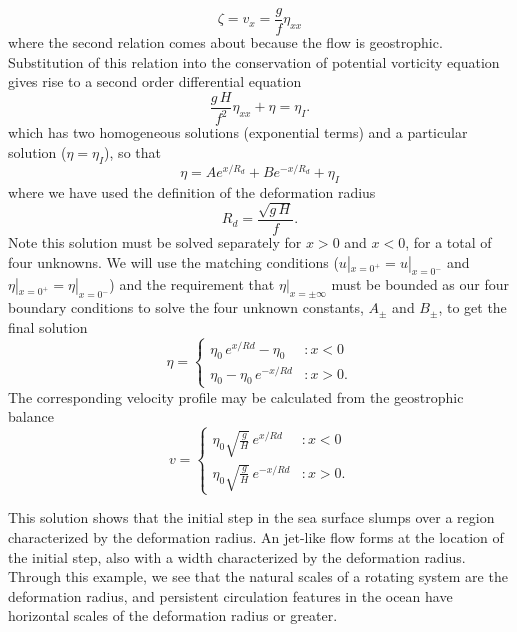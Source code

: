 \documentclass[11pt]{report}
\numberwithin{equation}{section}
\begin{document}
\begin{equation}
    \zeta = v_x = \frac{g}{f} \eta_{xx}
\end{equation}
where the second relation comes about because the flow is geostrophic.  Substitution of this relation into the conservation of potential vorticity equation gives rise to a second order differential equation
\begin{equation}
    \label{eq:step_adjustment_field}
    \frac{g\,H}{f^2} \eta_{xx} + \eta = \eta_I.
\end{equation}
which has two homogeneous solutions (exponential terms) and a particular solution ($\eta=\eta_I$), so that
\begin{equation}
    \eta = A e^{x/R_d} + B e^{-x/R_d} + \eta_I
\end{equation}
where we have used the definition of the deformation radius
\begin{equation}
    R_d = \frac{\sqrt{g\,H}}{f}.
\end{equation}
Note this solution must be solved separately for $x>0$ and $x<0$, for a total of four unknowns.  We will use the matching conditions ($u|_{x=0^+} = u|_{x=0^-}$ and $\eta|_{x=0^+} = \eta|_{x=0^-}$) and the requirement that $\eta|_{x=\pm\infty}$ must be bounded as our four boundary conditions to solve the four unknown constants, $A_{\pm}$ and $B_{\pm}$, to get the final solution
\begin{displaymath}
    \eta =
    \begin{cases}
        \eta_0\,e^{x/Rd} - \eta_0    & : x < 0 \\
        \eta_0 - \eta_0\,e^{-x/Rd}   & : x > 0 .
    \end{cases}
\end{displaymath}
The corresponding velocity profile may be calculated from the geostrophic balance
\begin{displaymath}
    v = 
    \begin{cases}
        \eta_0\sqrt{\frac{g}{H}}\,e^{x/Rd}   & : x < 0\\
        \eta_0\sqrt{\frac{g}{H}}\,e^{-x/Rd}  & : x > 0. 
    \end{cases}
\end{displaymath}

This solution shows that the initial step in the sea surface slumps over a region characterized by the deformation radius.  An jet-like flow forms at the location of the initial step, also with a width characterized by the deformation radius.  Through this example, we see that the natural scales of a rotating system are the deformation radius, and persistent circulation features in the ocean have horizontal scales of the deformation radius or greater.
\end{document}
